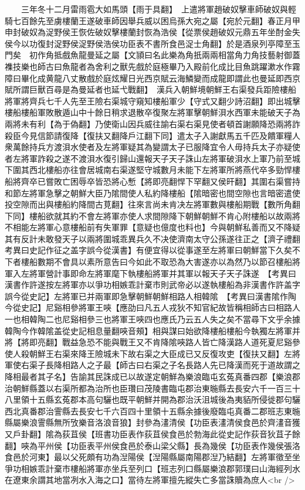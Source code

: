 　　三年冬十二月雷雨雹大如馬頭【雨于具翻】　上遣將軍趙破奴擊車師破奴與輕騎七百餘先至虜樓蘭王遂破車師因舉兵威以困烏孫大宛之屬【宛於元翻】春正月甲申封破奴為浞野侯王恢佐破奴擊樓蘭封恢為浩侯【從票侯趙破奴元鼎五年坐酎金失侯今以功復封浞野侯浞野侯浩侯功臣表不書所食邑浞士角翻】於是酒泉列亭障至玉門矣　初作角抵戲魚龍曼延之屬【文頴曰名此樂為角扺兩兩相當角力角技藝射御蓋襍技樂也師古曰魚龍者為舍利之獸先戲於庭極畢乃入殿前化成比目魚跳躍漱水作霧障曰畢化成黄龍八丈散戲於庭炫耀日光西京賦云海鱗變而成龍即謂此也曼延即西京賦所謂巨獸百尋是為曼延者也延弋戰翻】　漢兵入朝鮮境朝鮮王右渠發兵距險樓船將軍將齊兵七千人先至王險右渠城守窺知樓船軍少【守式又翻少詩沼翻】即出城擊樓船樓船軍敗散遁山中十餘日稍求退散卒復聚左將軍擊朝鮮浿水西軍未能破天子為兩將未有利【為于偽翻】乃使衛山因兵威往諭右渠右渠見使者頓首謝願降恐兩將詐殺臣今見信節請復降【復扶又翻降戶江翻下同】遣太子入謝獻馬五千匹及饋軍糧人衆萬餘持兵方渡浿水使者及左將軍疑其為變謂太子已服降宜令人毋持兵太子亦疑使者左將軍詐殺之遂不渡浿水復引歸山還報天子天子誅山左將軍破浿水上軍乃前至城下圍其西北樓船亦往會居城南右渠遂堅守城數月未能下左將軍所將燕代卒多勁悍樓船將齊卒已嘗敗亡困辱卒皆恐將心慙【將即亮翻悍下罕翻又侯旰翻】其圍右渠嘗持和節左將軍急擊之朝鮮大臣乃隂間使人私約降樓船【隂暗密也間空隙也言暗密遣使投空隙而出與樓船約降間古莧翻】往來言尚未肯决左將軍數與樓船期戰【數所角翻下同】樓船欲就其約不會左將軍亦使人求間隙降下朝鮮朝鮮不肯心附樓船以故兩將不相能左將軍心意樓船前有失軍罪【意疑也億度也料也】今與朝鮮私善而又不降疑其有反計未敢發天子以兩將圍城乖異兵久不决使濟南太守公孫遂往正之【濟子禮翻考異曰史記作征之盖字誤今從漢書】有便宜得以從事遂至左將軍曰朝鮮當下久矣不下者樓船數期不會具以素所意告曰今如此不取恐為大害遂亦以為然乃以節召樓船將軍入左將軍營計事即命左將軍麾下執樓船將軍并其軍以報天子天子誅遂　【考異曰漢書作許遂按左將軍亦以爭功相嫉乖計棄市則武帝必以遂執樓船為非漢書作許盖字誤今從史記】左將軍已并兩軍即急擊朝鮮朝鮮相路人相韓隂　【考異曰漢書隂作陶今從史記】尼谿相參將軍王唊【應劭曰凡五人戎狄不知官紀故皆稱相師古曰相路人一也相韓陶二也尼谿相參三也將軍王唊四也應氏乃云五人失之矣不當尋下文乎余據韓陶今作韓隂盖從史記相息量翻唊音頰】相與謀曰始欲降樓船樓船今執獨左將軍并將【將即亮翻】戰益急恐不能與戰王又不肯降隂唊路人皆亡降漢路人道死夏尼谿參使人殺朝鮮王右渠來降王險城未下故右渠之大臣成已又反復攻吏【復扶又翻】左將軍使右渠子長降相路人之子最【師古曰右渠之子名長路人先已降漢而死于道故謂之降相最者其子名】告諭其民誅成已以故遂定朝鮮為樂浪臨屯玄菟真番四郡【樂浪郡治朝鮮縣蓋以右渠所都為治所也臣瓚曰茂陵書臨屯郡治東暆縣去長安六千一百三十八里領十五縣玄菟郡本高句驪也既平朝鮮并開為郡治沃沮城後為夷貊所侵徙郡句驪西北真番郡治霅縣去長安七千六百四十里領十五縣余據後廢臨屯真番二郡班志東暆縣屬樂浪霅縣無所攷樂音洛浪音狼】封參為澅清侯【功臣表澅清侯食邑於齊澅音獲又戶卦翻】隂為荻苴侯【班書功臣表作荻苴侯食邑於勃海此從史記作荻音狄苴子餘翻】唊為平州侯【功臣表平州侯食邑於泰山梁父縣】長為幾侯【功臣表作幾侯張洛食邑於河東】最以父死頗有功為湼陽侯【湼陽縣屬南陽郡湼乃結翻】左將軍徵至坐爭功相嫉乖計棄市樓船將軍亦坐兵至列口【班志列口縣屬樂浪郡郭璞曰山海經列水在遼東余謂其地當冽水入海之口】當待左將軍擅先縱失亡多當誅贖為庶人<br />
